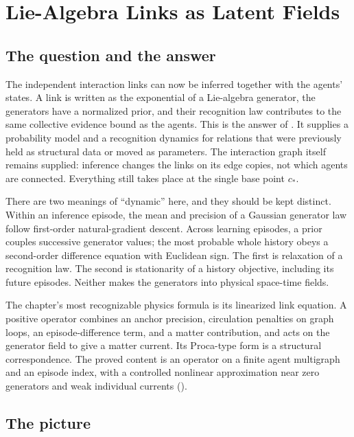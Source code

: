 \chapter{Lie-Algebra Links as Latent Fields}
\label{comp:links}
\label{comp:lie-links}

\section{The question and the answer}
\label{comp:links-question}

The independent interaction links can now be inferred together with the agents' states. A link is
written as the exponential of a Lie-algebra generator, the generators have a normalized prior, and
their recognition law contributes to the same collective evidence bound as the agents. This is the
answer of . It supplies a probability model and a recognition dynamics for relations
that were previously held as structural data or moved as parameters. The interaction graph itself
remains supplied: inference changes the links on its edge copies, not which agents are connected.
Everything still takes place at the single base point $c_*$.

There are two meanings of ``dynamic'' here, and they should be kept distinct. Within an inference
episode, the mean and precision of a Gaussian generator law follow first-order natural-gradient
descent. Across learning episodes, a prior couples successive generator values; the most probable
whole history obeys a second-order difference equation with Euclidean sign. The first is relaxation
of a recognition law. The second is stationarity of a history objective, including its future
episodes. Neither makes the generators into physical space-time fields.

The chapter's most recognizable physics formula is its linearized link equation. A positive
operator combines an anchor precision, circulation penalties on graph loops, an episode-difference
term, and a matter contribution, and acts on the generator field to give a matter current. Its
Proca-type form is a structural correspondence. The proved content is an operator on a finite
agent multigraph and an episode index, with a controlled nonlinear approximation near zero
generators and weak individual currents ().

\section{The picture}
\label{comp:links-picture}

